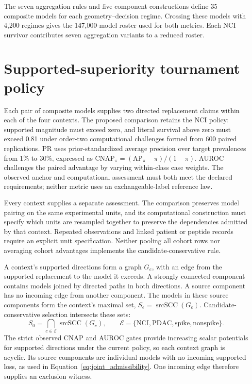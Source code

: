 \documentclass[11pt]{article}
\begin{document}
The seven aggregation rules and five component constructions define 35
composite models for each geometry--decision regime. Crossing these models
with 4,200 regimes gives the 147,000-model roster used for both metrics. Each
NCI survivor contributes seven aggregation variants to a reduced roster.

\section{Supported-superiority tournament policy}
\label{app:supported-tournament}

Each pair of composite models supplies two directed replacement claims within
each of the four contexts. The proposed comparison retains the NCI policy:
supported magnitude must exceed zero, and literal survival above zero must
exceed 0.81 under order-two computational challenges formed from 600 paired
replications. PR uses prior-standardized average precision over target
prevalences from 1\% to 30\%, expressed as
\(\mathrm{CNAP}_{\pi}=(\mathrm{AP}_{\pi}-\pi)/(1-\pi)\).
AUROC challenges the paired advantage by varying within-class case weights.
The observed anchor and computational assessment must both meet the declared
requirements; neither metric uses an exchangeable-label reference law.

Every context supplies a separate assessment. The comparison preserves model
pairing on the same experimental units, and its computational construction must
specify which units are resampled together to preserve the dependencies admitted
by that context. Repeated observations and linked patient or peptide records
require an explicit unit specification. Neither pooling all cohort rows nor
averaging cohort advantages implements the candidate-conservative rule.

A context's supported directions form a graph \(G_e\), with an edge from
the supported replacement to the model it exceeds. A strongly connected
component contains models joined by directed paths in both directions. A
source component has no incoming edge from another component. The models in
these source components form the context's maximal set,
\(S_e=\operatorname{srcSCC}(G_e)\). Candidate-conservative selection intersects
these sets:
\[
S_0=\bigcap_{e\in\mathcal{E}}\operatorname{srcSCC}(G_e),
\qquad
\mathcal{E}=\{\mathrm{NCI},\mathrm{PDAC},\mathrm{spike},\mathrm{nonspike}\}.
\]
The strict observed CNAP and AUROC gates provide increasing scalar potentials
for supported directions under the current policy, so each context graph is
acyclic. Its source components are individual models with no incoming
supported loss, as used in Equation~\eqref{eq:joint_admissibility}. One incoming
edge therefore supplies an exclusion witness.
\end{document}
